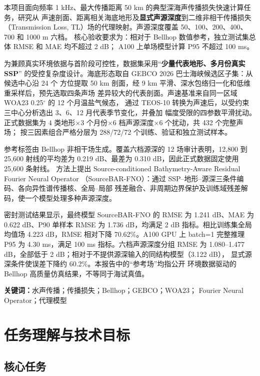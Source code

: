 \documentclass[UTF8,11pt]{ctexart}
\newcommand{\BestModel}{SourceBAR-FNO}
\newcommand{\BestRMSE}{1.241}
\newcommand{\BestMAE}{0.622}
\newcommand{\BestPninety}{1.736}
\newcommand{\GlobalBaseline}{4.223}
\newcommand{\RelativeReduction}{70.62}
\newcommand{\GpuPninetyfive}{4.30}
\begin{document}
本项目面向频率 1 kHz、最大传播距离 50 km 的典型深海声传播损失快速计算任务，研究从
声速剖面、距离相关海底地形及\textbf{显式声源深度}到二维非相干传播损失（Transmission
Loss, TL）场的代理映射。声源深度覆盖 50、100、200、400、700 和 1000 m 六档。
核心验收要求为：相对于 Bellhop 数值参考，独立测试集总体 RMSE 和 MAE 均不超过 2 dB；
A100 上单场模型计算 P95 不超过 100 ms。

为兼顾真实环境依据与首阶段可控性，数据集采用“\textbf{少量代表地形、多月份真实 SSP}”
的受控复杂度设计。海底形态取自 GEBCO 2026 巴士海峡候选区子集：从候选中心沿 24 个
方位提取 50 km 剖面，经 9 km 平滑、深水包络归一化和低维重采样后，预先选取四条声场
差异较大的代表剖面。声速基准来自同一区域 WOA23 0.25$^\circ$ 的 12 个月温盐气候态，
通过 TEOS-10 转换为声速后，以受约束三中心分析选出 3、6、12 月代表季节变化，并叠加
幅度受限的四参数平滑扰动。正式数据集为
$4$ 类地形$\times3$ 个月份$\times6$ 档声源深度$\times6$ 个扰动，共 432 个完整声场；
按三因素组合严格分层为 288/72/72 个训练、验证和独立测试样本。

参考标签由 Bellhop 非相干场生成。覆盖六档源深的 12 场审计表明，12,800 到 25,600
射线的平均差为 0.219 dB、最差为 0.310 dB，因此正式数据固定使用 25,600 条射线。
方法上提出 Source-conditioned Bathymetry-Aware Residual Fourier Neural Operator
（SourceBAR-FNO）：通过 SSP--地形--源深三条件编码、各向异性谱传播核、全局--局部
残差融合、非周期边界保护及训练域残差解码，使一个模型处理多种声源深度。

密封测试结果显示，最终模型 \BestModel{} 的 RMSE 为 \BestRMSE{} dB、MAE 为
\BestMAE{} dB、P90 单样本 RMSE 为 \BestPninety{} dB，均满足 2 dB 指标。相比训练集全局
均值场 \GlobalBaseline{} dB，RMSE 相对下降 \RelativeReduction{}\%。A100 GPU 上 batch=1
完整推理 P95 为 \GpuPninetyfive{} ms，满足 100 ms 指标。六档声源深度分组 RMSE 为
1.080--1.477 dB，全部低于 2 dB；相对于不提供源深输入的同结构模型（3.122 dB），
显式源深条件使误差下降约 60.2\%。本报告中的“参考场”均指公开
环境数据驱动的 Bellhop 高质量仿真结果，不等同于海试真值。

\vspace{0.5cm}
\noindent\textbf{关键词：}水声传播；传播损失；Bellhop；GEBCO；WOA23；
Fourier Neural Operator；代理模型

\clearpage
\tableofcontents
\clearpage
{}

\section{任务理解与技术目标}

\subsection{核心任务}
\end{document}
